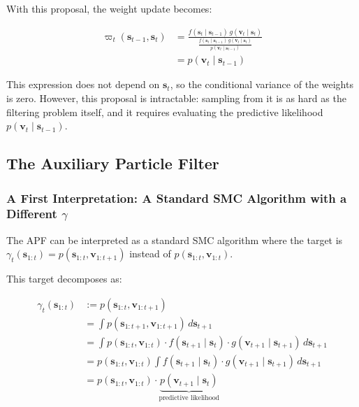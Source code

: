 \documentclass[11pt,a4paper]{article}
\begin{document}
With this proposal, the weight update becomes:

\begin{align}
\varpi_t(\mathbf{s}_{t-1}, \mathbf{s}_t) &= \frac{f(\mathbf{s}_t \mid \mathbf{s}_{t-1}) \, g(\mathbf{v}_t \mid \mathbf{s}_t)}{\frac{f(\mathbf{s}_t \mid \mathbf{s}_{t-1}) \, g(\mathbf{v}_t \mid \mathbf{s}_t)}{p(\mathbf{v}_t \mid \mathbf{s}_{t-1})}} \nonumber \\
&= p(\mathbf{v}_t \mid \mathbf{s}_{t-1})
\label{eq:optimal_weight}
\end{align}

This expression does not depend on $\mathbf{s}_t$, so the conditional variance of the weights is zero. However, this proposal is intractable: sampling from it is as hard as the filtering problem itself, and it requires evaluating the predictive likelihood $p(\mathbf{v}_t \mid \mathbf{s}_{t-1})$.

\subsection{The Auxiliary Particle Filter}

\subsubsection{A First Interpretation: A Standard SMC Algorithm with a Different $\gamma$}

The APF can be interpreted as a standard SMC algorithm where the target is $\gamma_t(\mathbf{s}_{1:t}) = p(\mathbf{s}_{1:t}, \mathbf{v}_{1:t+1})$ instead of $p(\mathbf{s}_{1:t}, \mathbf{v}_{1:t})$.

This target decomposes as:

\begin{align}
\gamma_t(\mathbf{s}_{1:t}) &:= p(\mathbf{s}_{1:t}, \mathbf{v}_{1:t+1}) \nonumber \\
&= \int p(\mathbf{s}_{1:t+1}, \mathbf{v}_{1:t+1}) \, d\mathbf{s}_{t+1} \nonumber \\
&= \int p(\mathbf{s}_{1:t}, \mathbf{v}_{1:t}) \cdot f(\mathbf{s}_{t+1} \mid \mathbf{s}_t) \cdot g(\mathbf{v}_{t+1} \mid \mathbf{s}_{t+1}) \, d\mathbf{s}_{t+1} \nonumber \\
&= p(\mathbf{s}_{1:t}, \mathbf{v}_{1:t}) \int f(\mathbf{s}_{t+1} \mid \mathbf{s}_t) \cdot g(\mathbf{v}_{t+1} \mid \mathbf{s}_{t+1}) \, d\mathbf{s}_{t+1} \nonumber \\
&= p(\mathbf{s}_{1:t}, \mathbf{v}_{1:t}) \cdot \underbrace{p(\mathbf{v}_{t+1} \mid \mathbf{s}_t)}_{\text{predictive likelihood}}
\label{eq:apf_target}
\end{align}
\end{document}
